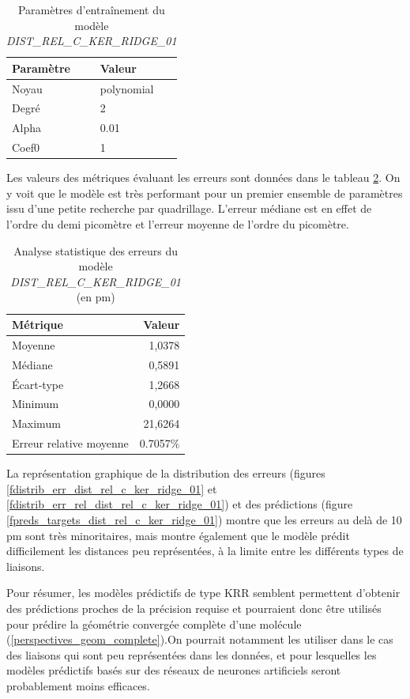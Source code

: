 \begin{table}
	\centering
	\begin{tabular}{|l|l|}
		\hline
		\textbf{Paramètre} & \textbf{Valeur} \\ \hline
		Noyau & polynomial \\ \hline
		Degré & 2 \\ \hline
		Alpha & 0.01 \\ \hline
		Coef0 & 1 \\ \hline
	\end{tabular}		
	\caption{Paramètres d'entraînement du modèle \emph{DIST\_REL\_C\_KER\_RIDGE\_01}}
	\label{tparams_dist_rel_c_ker_ridge_01}
\end{table}

\par Les valeurs des métriques évaluant les erreurs sont données dans le tableau \ref{tstats_dist_rel_c_ker_ridge_01}. On y voit que le modèle est très performant pour un premier ensemble de paramètres issu d'une petite recherche par quadrillage. L'erreur médiane est en effet de l'ordre du demi picomètre et l'erreur moyenne de l'ordre du picomètre.

\begin{table}
	\centering
	\begin{tabular}{|l|r|}
		\hline
		\textbf{Métrique} & \textbf{Valeur} \\ \hline
		Moyenne & 1,0378 \\ \hline
		Médiane & 0,5891 \\ \hline
		Écart-type & 1,2668 \\ \hline
		Minimum & 0,0000 \\ \hline
		Maximum & 21,6264\\ \hline
		Erreur relative moyenne & 0.7057\% \\ \hline
	\end{tabular}
	
	\caption{Analyse statistique des erreurs du modèle \emph{DIST\_REL\_C\_KER\_RIDGE\_01} (en pm)}
	\label{tstats_dist_rel_c_ker_ridge_01}
\end{table}

\par La représentation graphique de la distribution des erreurs (figures \ref{fdistrib_err_dist_rel_c_ker_ridge_01} et \ref{fdistrib_err_rel_dist_rel_c_ker_ridge_01}) et des prédictions (figure \ref{fpreds_targets_dist_rel_c_ker_ridge_01}) montre que les erreurs au delà de 10 pm sont très minoritaires, mais montre également que le modèle prédit difficilement les distances peu représentées, à la limite entre les différents types de liaisons.
\par Pour résumer, les modèles prédictifs de type KRR semblent permettent d'obtenir des prédictions proches de la précision requise et pourraient donc être utilisés pour prédire la géométrie convergée complète d'une molécule (\ref{perspectives_geom_complete}).On pourrait notamment les utiliser dans le cas des liaisons qui sont peu représentées dans les données, et pour lesquelles les modèles prédictifs basés sur des réseaux de neurones artificiels seront probablement moins efficaces.

